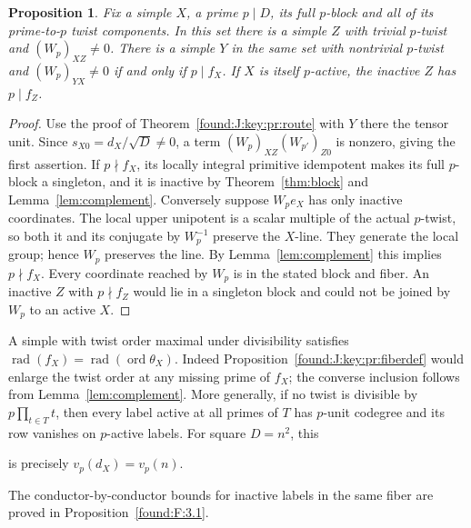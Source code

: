 \documentclass[11pt,a4paper]{article}
\numberwithin{equation}{section}
\newtheorem{proposition}[theorem]{Proposition}
\theoremstyle{remark}
\begin{document}
\begin{proposition}\label{found:J:4.2}\label{found:J:key:pr:fiberdef}
Fix a simple $X$, a prime $p\mid D$, its full $p$-block and all
of its prime-to-$p$ twist components. In this set there is a simple
$Z$ with trivial $p$-twist and $(W_p)_{XZ}\ne0$. There is a simple
$Y$ in the same set with nontrivial $p$-twist and
$(W_p)_{YX}\ne0$ if and only if $p\mid f_X$. If $X$ is itself
$p$-active, the inactive $Z$ has $p\mid f_Z$.
\end{proposition}
\begin{proof}
Use the proof of Theorem~\ref{found:J:key:pr:route} with $Y$ there the tensor
unit. Since $s_{X0}=d_X/\sqrt D\ne0$, a term
$(W_p)_{XZ}(W_{p'})_{Z0}$ is nonzero, giving the first assertion.
If $p\nmid f_X$, its locally integral primitive idempotent makes
its full $p$-block a singleton, and it is inactive by Theorem~\ref{thm:block} and Lemma~\ref{lem:complement}. Conversely suppose $W_pe_X$ has only inactive
coordinates. The local upper unipotent is a scalar multiple of the
actual $p$-twist, so both it and its conjugate by $W_p^{-1}$ preserve
the $X$-line. They generate the local group; hence $W_p$ preserves
the line. By Lemma~\ref{lem:complement} this implies $p\nmid f_X$.
Every coordinate reached by $W_p$ is in the stated block and fiber.
An inactive $Z$ with $p\nmid f_Z$ would lie in a singleton block
and could not be joined by $W_p$ to an active $X$.
\end{proof}

A simple with twist order maximal under divisibility satisfies
$\operatorname{rad}(f_X)=\operatorname{rad}(\operatorname{ord}\theta_X)$.
Indeed Proposition~\ref{found:J:key:pr:fiberdef} would enlarge the twist order
at any missing prime of $f_X$; the converse inclusion follows from Lemma~\ref{lem:complement}.
More generally, if no twist is divisible by $p\prod_{t\in T}t$,
then every label active at all primes of $T$ has $p$-unit codegree
and its row vanishes on $p$-active labels. For square $D=n^2$, this

is precisely $v_p(d_X)=v_p(n)$.

The conductor-by-conductor bounds for inactive labels in the same fiber
are proved in Proposition~\ref{found:F:3.1}.
\end{document}
